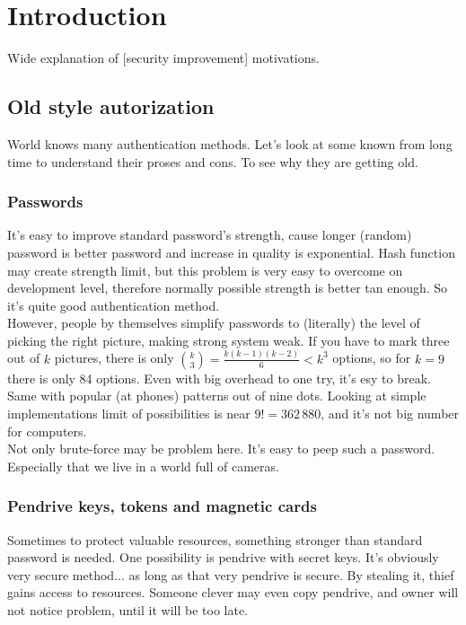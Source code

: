 \section{Introduction}
    Wide explanation of [security improvement] motivations.

    \subsection*{Old style autorization}
        World knows many authentication methods.
        Let's look at some known from long time
        to understand their proses and cons.
        To see why they are getting old.

        \subsubsection*{Passwords}
            It's easy to improve standard password's strength,
            cause longer (random) password is better password
            and increase in quality is exponential.
            Hash function may create strength limit,
            but this problem is very easy to overcome on development level,
            therefore normally possible strength is better tan enough.
            So it's quite good authentication method.\\
            However, people by themselves simplify passwords to
            (literally) the level of picking the right picture,
            making strong system weak.
            If you have to mark three out of $k$ pictures, there
            is only $\binom{k}{3} = \frac{k(k-1)(k-2)}{6} < k^3$ options,
            so for $k=9$ there is only 84 options.
            Even with big overhead to one try, it's esy to break.
            Same with popular (at phones) patterns out of
            nine dots. Looking at simple implementations
            limit of possibilities is near $9! = 362\,880$, %
            and it's not big number for computers.\\
            Not only brute-force may be problem here.
            It's easy to peep such a password.
            Especially that we live in a world full of cameras.

        \subsubsection*{Pendrive keys, tokens and magnetic cards}
            Sometimes to protect valuable resources,
            something stronger than standard password is needed.
            One possibility is pendrive with secret keys.
            It's obviously very secure method...
            as long as that very pendrive is secure.
            By stealing it, thief gains access to resources.
            Someone clever may even copy pendrive, and
            owner will not notice problem,
            until it will be too late.

